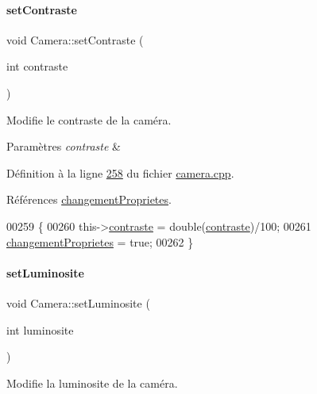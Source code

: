 \paragraph{\texorpdfstring{set\+Contraste}{setContraste}}
{\footnotesize\ttfamily void Camera\+::set\+Contraste (\begin{DoxyParamCaption}\item[{int}]{contraste }\end{DoxyParamCaption})\hspace{0.3cm}{\ttfamily [slot]}}



Modifie le contraste de la caméra. 


\begin{DoxyParams}{Paramètres}
{\em contraste} & \\
\hline
\end{DoxyParams}


Définition à la ligne \hyperlink{camera_8cpp_source_l00258}{258} du fichier \hyperlink{camera_8cpp_source}{camera.\+cpp}.



Références \hyperlink{camera_8h_source_l00070}{changement\+Proprietes}.


\begin{DoxyCode}
00259 \{
00260     this->\hyperlink{class_camera_ad3b300e52c91341d985d3b54f562a0f7}{contraste} = double(\hyperlink{class_camera_ad3b300e52c91341d985d3b54f562a0f7}{contraste})/100;
00261     \hyperlink{class_camera_a50d2b3ef5c08f8b61bbe2115d71005bd}{changementProprietes} = \textcolor{keyword}{true};
00262 \}
\end{DoxyCode}
\mbox{\label{class_camera_a25120dedc5f57638a866e1ff827fd641}} 
\paragraph{\texorpdfstring{set\+Luminosite}{setLuminosite}}
{\footnotesize\ttfamily void Camera\+::set\+Luminosite (\begin{DoxyParamCaption}\item[{int}]{luminosite }\end{DoxyParamCaption})\hspace{0.3cm}{\ttfamily [slot]}}



Modifie la luminosite de la caméra. 


